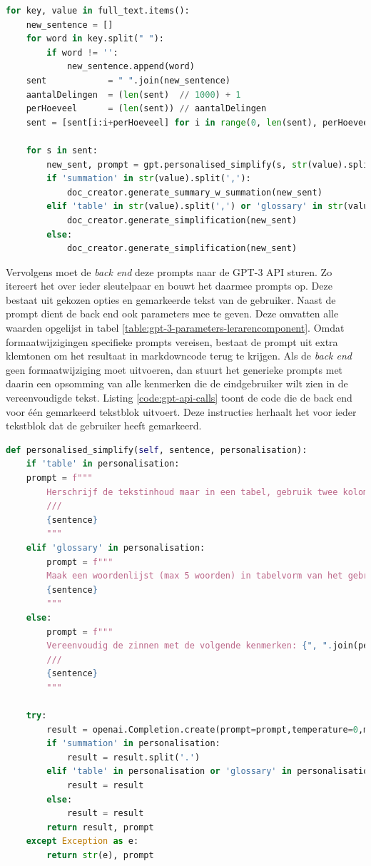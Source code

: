 \begin{lstlisting}[language=Python, caption={Alle gemarkeerde tekstblokken uit de localstorage aflopen en doorsturen naar het markdown document.}, label={code:localstorage-iteration}]
for key, value in full_text.items():
	new_sentence = []
	for word in key.split(" "):
		if word != '':
			new_sentence.append(word)
	sent            = " ".join(new_sentence)
	aantalDelingen  = (len(sent)  // 1000) + 1
	perHoeveel      = (len(sent)) // aantalDelingen
	sent = [sent[i:i+perHoeveel] for i in range(0, len(sent), perHoeveel)]
	
	for s in sent:
		new_sent, prompt = gpt.personalised_simplify(s, str(value).split(','))
		if 'summation' in str(value).split(','):
			doc_creator.generate_summary_w_summation(new_sent)
		elif 'table' in str(value).split(',') or 'glossary' in str(value).split(','):
			doc_creator.generate_simplification(new_sent)
		else:
			doc_creator.generate_simplification(new_sent)
\end{lstlisting}

Vervolgens moet de \textit{back end} deze prompts naar de GPT-3 API sturen. Zo itereert het over ieder sleutelpaar en bouwt het daarmee prompts op. Deze bestaat uit gekozen opties en gemarkeerde tekst van de gebruiker. Naast de prompt dient de back end ook parameters mee te geven. Deze omvatten alle waarden opgelijst in tabel \ref{table:gpt-3-parameters-lerarencomponent}. Omdat formaatwijzigingen specifieke prompts vereisen, bestaat de prompt uit extra klemtonen om het resultaat in markdowncode terug te krijgen. Als de \textit{back end} geen formaatwijziging moet uitvoeren, dan stuurt het generieke prompts met daarin een opsomming van alle kenmerken die de eindgebruiker wilt zien in de vereenvoudigde tekst. Listing \ref{code:gpt-api-calls} toont de code die de back end voor één gemarkeerd tekstblok uitvoert. Deze instructies herhaalt het voor ieder tekstblok dat de gebruiker heeft gemarkeerd.

\begin{lstlisting}[language=Python, caption={API-calls versturen naar de GPT-3 API.}, label={code:gpt-api-calls}]
def personalised_simplify(self, sentence, personalisation):
	if 'table' in personalisation:
	prompt = f"""
		Herschrijf de tekstinhoud maar in een tabel, gebruik twee kolommen naar keuze; schrijf dit in markdowncode.
		///
		{sentence}
		"""
	elif 'glossary' in personalisation:
		prompt = f"""
		Maak een woordenlijst (max 5 woorden) in tabelvorm van het gebruikte jargon uit deze tekst; schrijf dit in markdowncode. ///
		{sentence}
		"""
	else:
		prompt = f"""
		Vereenvoudig de zinnen met de volgende kenmerken: {", ".join(personalisation)}
		///
		{sentence}
		"""
	
	try:
		result = openai.Completion.create(prompt=prompt,temperature=0,max_tokens=len(prompt),model=COMPLETIONS_MODEL,top_p=0.9,stream=False)["choices"][0]["text"].strip(" \n")
		if 'summation' in personalisation:
			result = result.split('.')
		elif 'table' in personalisation or 'glossary' in personalisation:
			result = result
		else:
			result = result
		return result, prompt
	except Exception as e:
		return str(e), prompt
\end{lstlisting}

